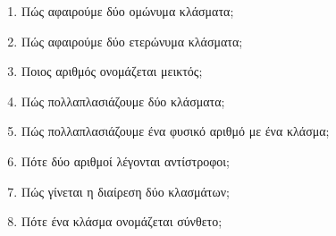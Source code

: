 \documentclass[a4paper,11pt]{report}
\begin{document}
\begin{enumerate}
\item Πώς αφαιρούμε δύο  ομώνυμα κλάσματα;
\item Πώς αφαιρούμε δύο  ετερώνυμα κλάσματα;
\item Ποιος αριθμός ονομάζεται μεικτός;
\item Πώς πολλαπλασιάζουμε δύο κλάσματα;
\item Πώς πολλαπλασιάζουμε ένα φυσικό αριθμό με ένα κλάσμα; 
\item Πότε δύο αριθμοί λέγονται αντίστροφοι;
\item Πώς γίνεται η διαίρεση δύο κλασμάτων;
\item Πότε ένα κλάσμα ονομάζεται σύνθετο;
\end{enumerate}
\end{document}
